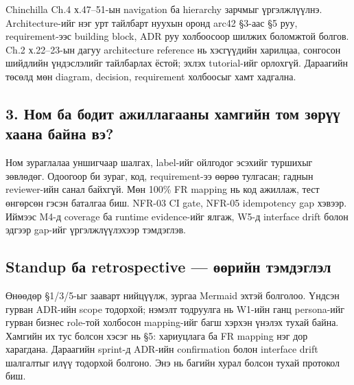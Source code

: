 \documentclass[
  mongolian,
]{article}
\begin{document}
Chinchilla Ch.4 х.47--51-ын navigation ба hierarchy зарчмыг
үргэлжлүүлнэ. Architecture-ийг нэг урт тайлбарт нуухын оронд arc42
§3-аас §5 руу, requirement-ээс building block, ADR руу холбоосоор шилжих
боломжтой болгов. Ch.2 х.22--23-ын дагуу architecture reference нь
хэсгүүдийн харилцаа, сонгосон шийдлийн үндэслэлийг тайлбарлах ёстой;
эхлэх tutorial-ийг орлохгүй. Дараагийн төсөлд мөн diagram, decision,
requirement холбоосыг хамт хадгална.

\subsection{3. Ном ба бодит ажиллагааны хамгийн том зөрүү хаана байна
вэ?}\label{ux43dux43eux43c-ux431ux430-ux431ux43eux434ux438ux442-ux430ux436ux438ux43bux43bux430ux433ux430ux430ux43dux44b-ux445ux430ux43cux433ux438ux439ux43d-ux442ux43eux43c-ux437ux4e9ux440ux4afux4af-ux445ux430ux430ux43dux430-ux431ux430ux439ux43dux430-ux432ux44d}

Ном зураглалаа уншигчаар шалгах, label-ийг ойлгодог эсэхийг туршихыг
зөвлөдөг. Одоогоор би зураг, код, requirement-ээ өөрөө тулгасан; гаднын
reviewer-ийн санал байхгүй. Мөн 100\% FR mapping нь код ажиллаж, тест
өнгөрсөн гэсэн баталгаа биш. NFR-03 CI gate, NFR-05 idempotency gap
хэвээр. Иймээс M4-д coverage ба runtime evidence-ийг ялгаж, W5-д
interface drift болон эдгээр gap-ийг үргэлжлүүлэхээр тэмдэглэв.

\subsection{Standup ба retrospective --- өөрийн
тэмдэглэл}\label{standup-ux431ux430-retrospective-ux4e9ux4e9ux440ux438ux439ux43d-ux442ux44dux43cux434ux44dux433ux43bux44dux43b}

Өнөөдөр §1/3/5-ыг зааварт нийцүүлж, зургаа Mermaid эхтэй болголоо.
Үндсэн гурван ADR-ийн scope тодорхой; нэмэлт тодруулга нь W1-ийн ганц
persona-ийг гурван бизнес role-той холбосон mapping-ийг багш хэрхэн
үнэлэх тухай байна. Хамгийн их тус болсон хэсэг нь §5: хариуцлага ба FR
mapping нэг дор харагдана. Дараагийн sprint-д ADR-ийн confirmation болон
interface drift шалгалтыг илүү тодорхой болгоно. Энэ нь багийн хурал
болсон тухай протокол биш.
\end{document}
